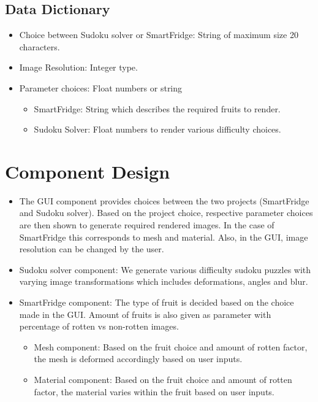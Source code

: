 \documentclass[a4paper,12pt]{article}
\begin{document}
\subsection{Data Dictionary}
\begin{itemize}
\item Choice between Sudoku solver or SmartFridge: String of maximum size 20 characters.
\item Image Resolution: Integer type.
\item Parameter choices: Float numbers or string
\begin{itemize}
\item SmartFridge: String which describes the required fruits to render.
\item Sudoku Solver: Float numbers to render various difficulty choices.
\end{itemize}
\end{itemize}
\section{Component Design}
\begin{itemize}
\item  The GUI component provides choices between the two projects (SmartFridge and Sudoku solver). Based on the project choice, respective parameter choices are then shown to generate required rendered images. In the case of SmartFridge this corresponds to mesh and material. Also, in the GUI, image resolution can be changed by the user.
\item Sudoku solver component: We generate various difficulty sudoku puzzles with varying image transformations which includes deformations, angles and blur.
\item SmartFridge component: The type of fruit is decided based on the choice made in the GUI. Amount of fruits is also given as parameter with percentage of rotten vs non-rotten images.
\begin{itemize}
\item Mesh component: Based on the fruit choice and amount of rotten factor, the mesh is deformed accordingly based on user inputs.
\item Material component: Based on the fruit choice and amount of rotten factor, the material varies within the fruit based on user inputs.
\end{itemize}
\end{itemize}
\end{document}
